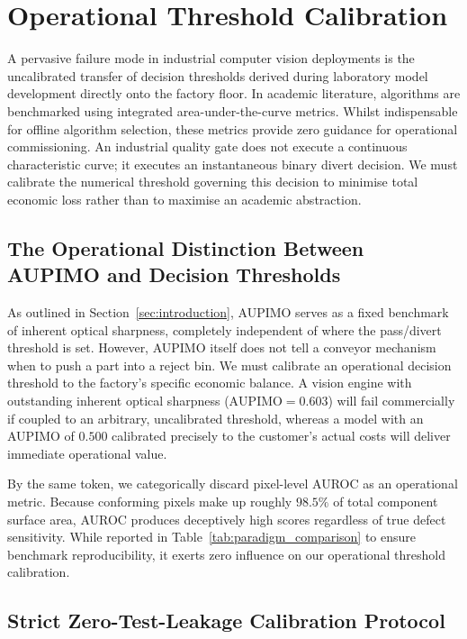 \section{Operational Threshold Calibration}
\label{sec:threshold_calibration}

A pervasive failure mode in industrial computer vision deployments is the uncalibrated transfer of decision thresholds derived during laboratory model development directly onto the factory floor. In academic literature, algorithms are benchmarked using integrated area-under-the-curve metrics. Whilst indispensable for offline algorithm selection, these metrics provide zero guidance for operational commissioning. An industrial quality gate does not execute a continuous characteristic curve; it executes an instantaneous binary divert decision. We must calibrate the numerical threshold governing this decision to minimise total economic loss rather than to maximise an academic abstraction.

\subsection{The Operational Distinction Between AUPIMO and Decision Thresholds}

As outlined in Section~\ref{sec:introduction}, AUPIMO serves as a fixed benchmark of inherent optical sharpness, completely independent of where the pass/divert threshold is set. However, AUPIMO itself does not tell a conveyor mechanism when to push a part into a reject bin. We must calibrate an operational decision threshold to the factory's specific economic balance. A vision engine with outstanding inherent optical sharpness ($\text{AUPIMO} = 0.603$) will fail commercially if coupled to an arbitrary, uncalibrated threshold, whereas a model with an AUPIMO of $0.500$ calibrated precisely to the customer's actual costs will deliver immediate operational value. 

By the same token, we categorically discard pixel-level AUROC as an operational metric. Because conforming pixels make up roughly $98.5\%$ of total component surface area, AUROC produces deceptively high scores regardless of true defect sensitivity. While reported in Table~\ref{tab:paradigm_comparison} to ensure benchmark reproducibility, it exerts zero influence on our operational threshold calibration.

\subsection{Strict Zero-Test-Leakage Calibration Protocol}

